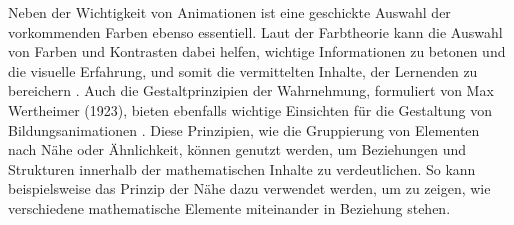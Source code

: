Neben der Wichtigkeit von Animationen ist eine geschickte Auswahl der vorkommenden Farben ebenso essentiell. Laut der Farbtheorie kann die Auswahl von Farben und Kontrasten dabei helfen, wichtige Informationen zu betonen und die visuelle Erfahrung, und somit die vermittelten Inhalte, der Lernenden zu bereichern \autocite{ballard_art_1964}. Auch die Gestaltprinzipien der Wahrnehmung, formuliert von Max Wertheimer (1923), bieten ebenfalls wichtige Einsichten für die Gestaltung von Bildungsanimationen \autocite{wertheimer_untersuchungen_2017}. Diese Prinzipien, wie die Gruppierung von Elementen nach Nähe oder Ähnlichkeit, können genutzt werden, um Beziehungen und Strukturen innerhalb der mathematischen Inhalte zu verdeutlichen. So kann beispielsweise das Prinzip der Nähe dazu verwendet werden, um zu zeigen, wie verschiedene mathematische Elemente miteinander in Beziehung stehen. 